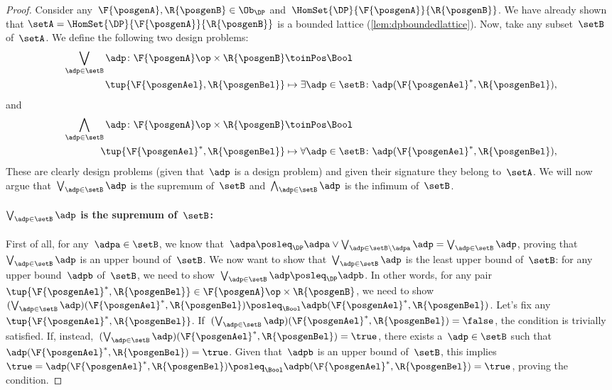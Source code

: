 \begin{proof}
    Consider any~$\F{\posgenA},\R{\posgenB}\in \Ob_\DP$ and~$\HomSet{\DP}{\F{\posgenA}}{\R{\posgenB}}$.
    We have already shown that $\setA=\HomSet{\DP}{\F{\posgenA}}{\R{\posgenB}}$ is a bounded lattice (\cref{lem:dpboundedlattice}).
    Now, take any subset~$\setB$ of~$\setA$.
    We define the following two design problems:
    \begin{equation*}
        \begin{aligned}
            \bigvee_{\adp \in \setB} \adp\colon \F{\posgenA}\op \times \R{\posgenB}&\toinPos \Bool\\
            \tup{\F{\posgenAel},\R{\posgenBel}}&\mapsto \exists \adp\in \setB\colon \adp(\F{\posgenAel}^*,\R{\posgenBel}),
        \end{aligned}
    \end{equation*}
    and
    \begin{equation*}
        \begin{aligned}
            \bigwedge_{\adp \in \setB} \adp\colon \F{\posgenA}\op \times \R{\posgenB}&\toinPos \Bool\\
            \tup{\F{\posgenAel}^*,\R{\posgenBel}}&\mapsto \forall \adp\in \setB\colon \adp(\F{\posgenAel}^*,\R{\posgenBel}),
        \end{aligned}
    \end{equation*}
    These are clearly design problems (given that~$\adp$ is a design problem) and given their signature they belong to~$\setA$.
    We will now argue that~$\bigvee_{\adp \in \setB} \adp$ is the supremum of~$\setB$ and~$\bigwedge_{\adp \in \setB} \adp$ is the infimum of~$\setB$.
    \paragraph*{$\bigvee_{\adp \in \setB} \adp$ is the supremum of~$\setB$:}
    First of all, for any~$\adpa\in \setB$, we know that~$\adpa\posleq_\DP \adpa \vee \bigvee_{\adp \in \setB \backslash \adpa} \adp= \bigvee_{\adp \in \setB} \adp$, proving that~$\bigvee_{\adp \in \setB} \adp$ is an upper bound of~$\setB$.
        We now want to show that~$\bigvee_{\adp \in \setB} \adp$ is the least upper bound of~$\setB$: for any upper bound~$\adpb$ of~$\setB$, we need to show~$\bigvee_{\adp \in \setB} \adp \posleq_\DP\adpb$.
        In other words, for any pair~$\tup{\F{\posgenAel}^*,\R{\posgenBel}}\in \F{\posgenA}\op\times \R{\posgenB}$, we need to show~$(\bigvee_{\adp \in \setB} \adp)(\F{\posgenAel}^*,\R{\posgenBel})\posleq_\Bool \adpb(\F{\posgenAel}^*,\R{\posgenBel})$.
        Let's fix any~$\tup{\F{\posgenAel}^*,\R{\posgenBel}}$. If~$(\bigvee_{\adp \in \setB} \adp)(\F{\posgenAel}^*,\R{\posgenBel})=\false$, the condition is trivially satisfied.
        If, instead,~$(\bigvee_{\adp \in \setB} \adp)(\F{\posgenAel}^*,\R{\posgenBel})=\true$, there exists a~$\adp\in \setB$ such that~$\adp(\F{\posgenAel}^*,\R{\posgenBel})=\true$.
        Given that~$\adpb$ is an upper bound of~$\setB$, this implies~$\true=\adp(\F{\posgenAel}^*,\R{\posgenBel})\posleq_\Bool \adpb(\F{\posgenAel}^*,\R{\posgenBel})=\true$, proving the condition.


\end{proof}
